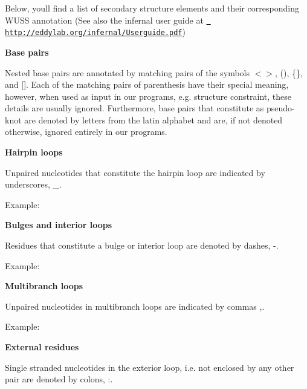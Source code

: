 Below, you\textquotesingle{}ll find a list of secondary structure elements and their corresponding W\+U\+SS annotation (See also the infernal user guide at \href{http://eddylab.org/infernal/Userguide.pdf}{\texttt{ http\+://eddylab.\+org/infernal/\+Userguide.\+pdf}})


\begin{DoxyItemize}
\item {\bfseries{Base pairs}}

Nested base pairs are annotated by matching pairs of the symbols {\ttfamily $<$$>$}, {\ttfamily ()}, {\ttfamily \{\}}, and {\ttfamily \mbox{[}\mbox{]}}. Each of the matching pairs of parenthesis have their special meaning, however, when used as input in our programs, e.\+g. structure constraint, these details are usually ignored. Furthermore, base pairs that constitute as pseudo-\/knot are denoted by letters from the latin alphabet and are, if not denoted otherwise, ignored entirely in our programs.
\item {\bfseries{Hairpin loops}}

Unpaired nucleotides that constitute the hairpin loop are indicated by underscores, {\ttfamily \+\_\+}.

Example\+:
\begin{DoxyCode}{0}
\DoxyCodeLine{<<<<<\_\_\_\_\_>>>>>}
\end{DoxyCode}

\item {\bfseries{Bulges and interior loops}}

Residues that constitute a bulge or interior loop are denoted by dashes, {\ttfamily -\/}.

Example\+:
\begin{DoxyCode}{0}
\DoxyCodeLine{(((--<<\_\_\_\_\_>>-)))}
\end{DoxyCode}

\item {\bfseries{Multibranch loops}}

Unpaired nucleotides in multibranch loops are indicated by commas {\ttfamily ,}.

Example\+:
\begin{DoxyCode}{0}
\DoxyCodeLine{(((,,<<\_\_\_\_\_>>,<<\_\_\_\_>>)))}
\end{DoxyCode}

\item {\bfseries{External residues}}

Single stranded nucleotides in the exterior loop, i.\+e. not enclosed by any other pair are denoted by colons, {\ttfamily \+:}.


\end{DoxyItemize}
